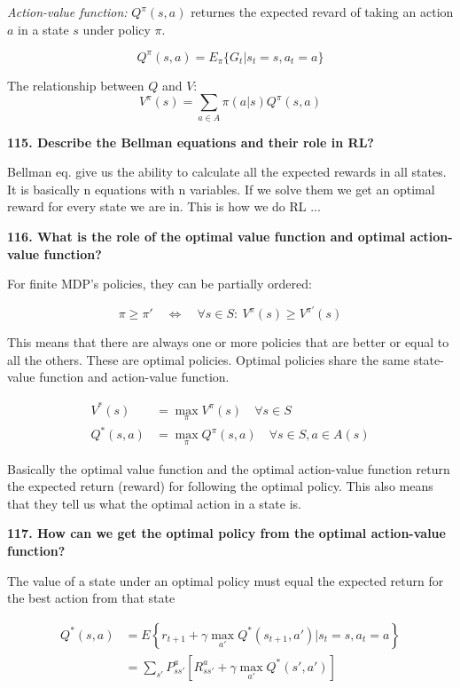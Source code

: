 \textit{Action-value function:} $Q^\pi (s, a)$ returnes the expected revard
of taking an action $a$ in a state $s$ under policy $\pi$.

\[ Q^\pi (s, a) = E_\pi \{ G_t | s_t = s, a_t = a\}\]

The relationship between $Q$ and $V$:
\[ V^\pi(s) = \sum_{a \in A} \pi(a | s) Q^\pi (s,a)\]


\textbf{115. Describe the Bellman equations and their role in RL?}

Bellman eq. give us the ability to calculate all the expected rewards in
all states. It is basically n equations with n variables. If we solve
them we get an optimal reward for every state we are in. This is how we
do RL ...

\textbf{116. What is the role of the optimal value function and optimal
action-value function?}

For finite MDP's policies, they can be partially ordered:

\[ \pi \geq \pi' \quad \iff \quad \forall s \in S : \ V^\pi (s) \geq V^{\pi'}(s)\]

This means that there are always one or more policies that are better or
equal to all the others. These are optimal policies. Optimal policies
share the same state-value function and action-value function.

\begin{align*}
  V^*(s) &= \max_\pi V^\pi (s) \quad \forall s \in S \\
  Q^*(s, a) &= \max_\pi Q^\pi (s, a) \quad \forall s \in S, a \in A(s)
\end{align*}
  
Basically the optimal value function and the optimal action-value
function return the expected return (reward) for following the optimal
policy. This also means that they tell us what the optimal action in a
state is.

\textbf{117. How can we get the optimal policy from the optimal
action-value function?}

The value of a state under an optimal policy must equal the expected
return for the best action from that state

\begin{align*}
  Q^*(s,a) &= E \left\{ r_{t+1} + \gamma \max_{a'} Q^* (s_{t+1}, a') | s_t = s, a_t = a \right\} \\
   &= \sum_{s'} P_{ss'}^{a} \left[ R_{ss'}^a + \gamma \max_{a'} Q^*(s', a')\right]
\end{align*}


